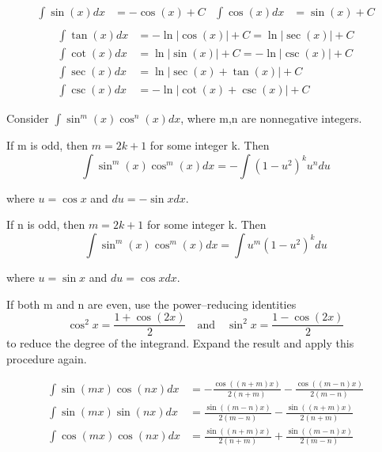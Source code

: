 \begin{theorem}
  \[\begin{aligned}
    \int \sin(x) dx &= -\cos(x) + C & \int \cos(x) dx &= \sin(x) + C \\
  \end{aligned}\]
  \[\begin{aligned}
    \int \tan(x) dx &= -\ln |\cos(x)| + C = \ln |\sec(x)| + C \\
    \int \cot(x) dx &= \ln |\sin(x)| + C = -\ln |\csc(x)| + C \\
    \int \sec(x) dx &= \ln |\sec(x) + \tan(x)| + C \\
    \int \csc(x) dx &= -\ln |\cot(x) + \csc(x)| + C
  \end{aligned}\]
\end{theorem}


  

\begin{procedure}
  Consider $\int \sin^m (x) \cos^n (x) dx$, where m,n are nonnegative integers.
  
  If m is odd, then $m=2k+1$ for some integer k. Then
  \[
    \int \sin^m (x) \cos^m (x) dx = - \int (1 - u^2)^k u^n du
  \]
  
  where $u=\cos x$ and $du=-\sin x dx$.
  
  If n is odd, then $m=2k+1$ for some integer k. Then
  \[
    \int \sin^m (x) \cos^m (x) dx = \int u^m (1 - u^2)^k du
  \]
  
  where $u=\sin x$ and $du=\cos x dx$.

  If both m and n are even, use the power--reducing identities
  \[
    \cos^2x = \frac{1+\cos (2x)}{2} \quad \text{and}\quad \sin^2x = \frac{1-\cos(2x)}2
  \]
  to reduce the degree of the integrand. Expand the result and apply this procedure again.
\end{procedure}

\begin{theorem}
  \[\begin{aligned}
    \int \sin(mx) \cos(nx) dx &= -\frac{\cos((n + m) x)}{2 (n + m)} - \frac{\cos((m - n) x)}{2 (m - n)} \\
    \int \sin(mx) \sin(nx) dx &= \frac{\sin((m - n) x)}{2 (m - n)} - \frac{\sin((n + m) x)}{2 (n + m)} \\
    \int \cos(mx) \cos(nx) dx &= \frac{\sin((n + m) x)}{2 (n + m)} + \frac{\sin((m - n) x)}{2 (m - n)}
  \end{aligned}\]
\end{theorem}

